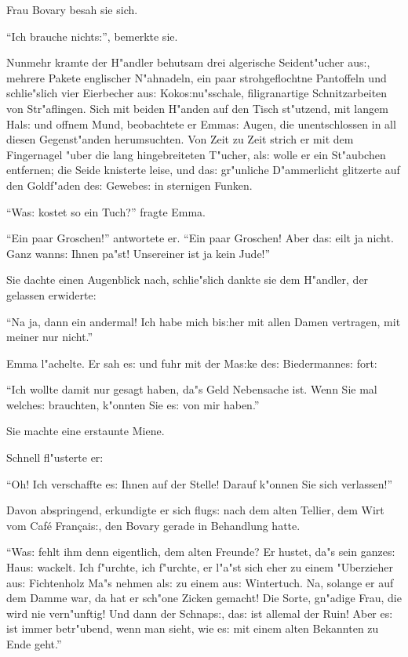 \documentclass[oneside,12pt]{book}
\newcommand{\s}{s:}%
\begin{document}
Frau Bovary besah sie sich.

"`Ich brauche nicht{\s}"', bemerkte sie.

Nunmehr kramte der H"andler behutsam drei algerische Seident"ucher
au{\s}, mehrere Pakete englischer N"ahnadeln, ein paar
strohgeflochtne Pantoffeln und schlie"slich vier Eierbecher au{\s}
Koko{\s}nu"sschale, filigranartige Schnitzarbeiten von
Str"aflingen. Sich mit beiden H"anden auf den Tisch st"utzend, mit
langem Hal{\s} und offnem Mund, beobachtete er Emma{\s} Augen, die
unentschlossen in all diesen Gegenst"anden herumsuchten. Von Zeit
zu Zeit strich er mit dem Fingernagel "uber die lang
hingebreiteten T"ucher, al{\s} wolle er ein St"aubchen entfernen;
die Seide knisterte leise, und da{\s} gr"unliche D"ammerlicht
glitzerte auf den Goldf"aden de{\s} Gewebe{\s} in sternigen
Funken.

"`Wa{\s} kostet so ein Tuch?"' fragte Emma.

"`Ein paar Groschen!"' antwortete er. "`Ein paar Groschen! Aber
da{\s} eilt ja nicht. Ganz wann{\s} Ihnen pa"st! Unsereiner ist ja
kein Jude!"'

Sie dachte einen Augenblick nach, schlie"slich dankte sie dem
H"andler, der gelassen erwiderte:

"`Na ja, dann ein andermal! Ich habe mich bi{\s}her mit allen
Damen vertragen, mit meiner nur nicht."'

Emma l"achelte. Er sah e{\s} und fuhr mit der Ma{\s}ke de{\s}
Biedermanne{\s} fort:

"`Ich wollte damit nur gesagt haben, da"s Geld Nebensache ist.
Wenn Sie mal welche{\s} brauchten, k"onnten Sie e{\s} von mir
haben."'

Sie machte eine erstaunte Miene.

Schnell fl"usterte er:

"`Oh! Ich verschaffte e{\s} Ihnen auf der Stelle! Darauf k"onnen
Sie sich verlassen!"'

Davon abspringend, erkundigte er sich flug{\s} nach dem alten
Tellier, dem Wirt vom Caf\'e Fran\c{c}ai{\s}, den Bovary gerade in
Behandlung hatte.

"`Wa{\s} fehlt ihm denn eigentlich, dem alten Freunde? Er hustet,
da"s sein ganze{\s} Hau{\s} wackelt. Ich f"urchte, ich f"urchte,
er l"a"st sich eher zu einem "Uberzieher au{\s} Fichtenholz Ma"s
nehmen al{\s} zu einem au{\s} Wintertuch. Na, solange er auf dem
Damme war, da hat er sch"one Zicken gemacht! Die Sorte, gn"adige
Frau, die wird nie vern"unftig! Und dann der Schnap{\s}, da{\s}
ist allemal der Ruin! Aber e{\s} ist immer betr"ubend, wenn man
sieht, wie e{\s} mit einem alten Bekannten zu Ende geht."'
\end{document}
